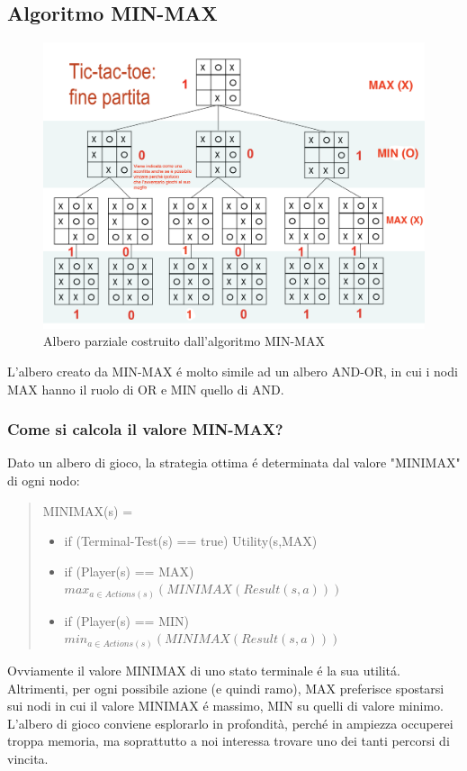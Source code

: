 \documentclass{article}
\begin{document}
\subsection{Algoritmo MIN-MAX}
\begin{figure}[H]
\centering
\includegraphics[scale=0.45]{Images/minmaxtictactoe.png}
\caption{Albero parziale costruito dall'algoritmo MIN-MAX}
\end{figure}
L'albero creato da MIN-MAX é molto simile ad un albero AND-OR, in cui i nodi MAX hanno il ruolo di OR e MIN quello di AND.

\subsubsection{Come si calcola il valore MIN-MAX?}
Dato un albero di gioco, la strategia ottima é determinata dal valore "MINIMAX" di ogni nodo:
\begin{quote}
MINIMAX(s) =
\begin{itemize}
    \item if (Terminal-Test(s) == true) Utility(s,MAX)
    \item if (Player(s) == MAX) $max_{a \in Actions(s)}(MINIMAX(Result(s,a)))$
    \item if (Player(s) == MIN) $min_{a \in Actions(s)}(MINIMAX(Result(s,a)))$
\end{itemize}
\end{quote}
Ovviamente il valore MINIMAX di uno stato terminale é la sua utilitá. Altrimenti, per ogni possibile azione (e quindi ramo), MAX preferisce spostarsi sui nodi in cui il valore MINIMAX é massimo, MIN su quelli di valore minimo. \newline
L'albero di gioco conviene esplorarlo in profondità, perché in ampiezza occuperei troppa memoria, ma soprattutto a noi interessa trovare uno dei tanti percorsi di vincita.
\end{document}
